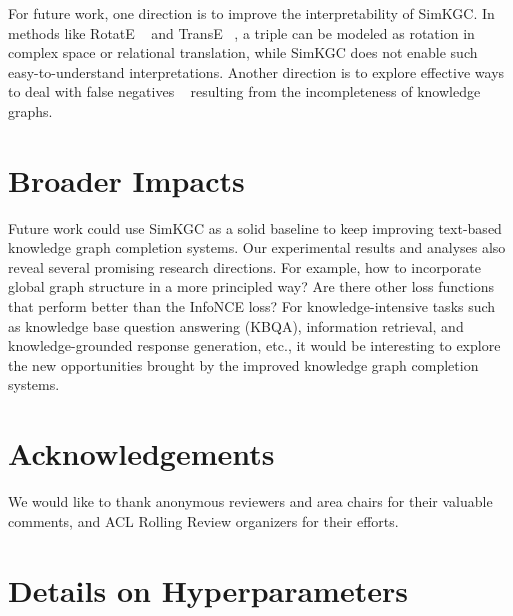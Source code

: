 \documentclass[11pt]{article}
\begin{document}
For future work,
one direction is to improve the interpretability of SimKGC.
In methods like RotatE ~\citep{sun2018rotate} and TransE ~\citep{bordes2013translating},
a triple can be modeled as rotation in complex space or relational translation,
while SimKGC does not enable such easy-to-understand interpretations.
Another direction is to explore effective ways to deal with false negatives ~\citep{Huynh2020BoostingCS}
resulting from the incompleteness of knowledge graphs.

\section{Broader Impacts}
Future work could use SimKGC as a solid baseline
to keep improving text-based knowledge graph completion systems.
Our experimental results and analyses also reveal several promising research directions.
For example,
how to incorporate global graph structure in a more principled way?
Are there other loss functions that perform better than the InfoNCE loss?
For knowledge-intensive tasks such as knowledge base question answering (KBQA),
information retrieval, and knowledge-grounded response generation, etc.,
it would be interesting to explore the new opportunities
brought by the improved knowledge graph completion systems.

\section*{Acknowledgements}
We would like to thank anonymous reviewers and area chairs for their valuable comments,
and ACL Rolling Review organizers for their efforts.




\appendix

\section{Details on Hyperparameters} ~\label{app:setup}
\end{document}

